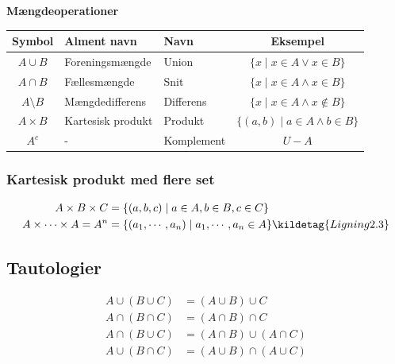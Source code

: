 \begin{table}[H]
    \centering
    \textbf{Mængdeoperationer}
    \begin{tabular}{>{\ttfamily}c l l c}
        \toprule
        \textrm{\textbf{Symbol}} & \textbf{Alment navn} & \textbf{Navn} & \textbf{Eksempel} \\
        \midrule
        $A \cup B$ & Foreningsmængde & Union & $\{x \mid x \in A \lor x \in B\}$ \\
        $A \cap B$ & Fællesmængde & Snit & $\{x \mid x \in A \land x \in B\}$ \\
        $A \setminus B$ & Mængdedifferens & Differens & $\{x \mid x \in A \land x \notin B\}$ \\
        $A \times B$ & Kartesisk produkt & Produkt & $\{(a,b) \mid a \in A \land b \in B\}$ \\
        $A^c$ & - & Komplement & $U - A$ \\
        \bottomrule
    \end{tabular}
\end{table}

\subsubsection{Kartesisk produkt med flere set}
\begin{align*}
    A \times B \times C &= \{(a,b,c) \mid a \in A, b \in B, c \in C\} \\
    A \times \cdots \times A = A^n &= \{(a_1,\cdots,a_n) \mid a_1,\cdots,a_n \in A\} \kildetag{Ligning 2.3}
\end{align*}

\subsection{Tautologier}
\begin{align*}
    A \cup (B \cup C) &= (A \cup B) \cup C \\
    A \cap (B \cap C) &= (A \cap B) \cap C \\
    A \cap (B \cup C) &= (A \cap B) \cup (A \cap C) \\
    A \cup (B \cap C) &= (A \cup B) \cap (A \cup C)
\end{align*}
